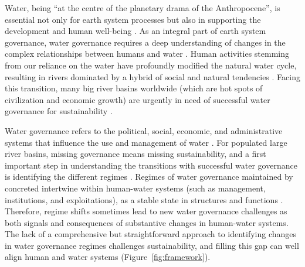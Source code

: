\label{Intro.}
Water, being ``at the centre of the planetary drama of the Anthropocene'', is essential not only for earth system processes but also in supporting the development and human well-being
\cite{gleeson2020a,gleeson2020b}.
As an integral part of earth system governance, water governance requires a deep understanding of changes in the complex relationships between humans and water
\cite{ahlstrom2021,biermann2012,steffen2020}.
Human activities stemming from our reliance on the water have profoundly modified the natural water cycle, resulting in rivers dominated by a hybrid of social and natural tendencies
\cite{sivapalan2012,qin2014,abbott2019}.
Facing this transition, many big river basins worldwide (which are hot spots of civilization and economic growth) are urgently in need of successful water governance for sustainability
\cite{best2019,dibaldassarre2019}.

Water governance refers to the political, social, economic, and administrative systems that influence the use and management of water \cite{oecd2018, wang2017}.
For populated large river basins, missing governance means missing sustainability, and a first important step in understanding the transitions with successful water governance is identifying the different regimes \cite{kjellen2015, grafton2013}.
Regimes of water governance maintained by concreted intertwine within human-water systems (such as management, institutions, and exploitations), as a stable state in structures and functions
\cite{falkenmark2021,bressers2013,loch2020}.
Therefore, regime shifts sometimes lead to new water governance challenges as both signals and consequences of substantive changes in human-water systems.
The lack of a comprehensive but straightforward approach to identifying changes in water governance regimes challenges sustainability, and filling this gap can well align human and water systems (Figure~\ref{fig:framework}).

